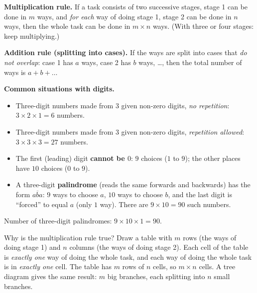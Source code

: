 \begin{knowbox}
\textbf{Multiplication rule.} If a task consists of two successive stages, stage 1 can be done in $m$ ways, and \emph{for each} way of doing stage 1, stage 2 can be done in $n$ ways, then the whole task can be done in $m\times n$ ways. (With three or four stages: keep multiplying.)

\medskip
\textbf{Addition rule (splitting into cases).} If the ways are split into cases that \emph{do not overlap}: case 1 has $a$ ways, case 2 has $b$ ways, \ldots, then the total number of ways is $a+b+\dots$

\medskip
\textbf{Common situations with digits.}
\begin{itemize}[leftmargin=1.2em,itemsep=1pt,topsep=2pt]
\item Three-digit numbers made from $3$ given non-zero digits, \emph{no repetition}: $3\times2\times1=6$ numbers.
\item Three-digit numbers made from $3$ given non-zero digits, \emph{repetition allowed}: $3\times3\times3=27$ numbers.
\item The first (leading) digit \textbf{cannot be $0$}: $9$ choices ($1$ to $9$); the other places have $10$ choices ($0$ to $9$).
\item A three-digit \textbf{palindrome} (reads the same forwards and backwards) has the form $\overline{aba}$: $9$ ways to choose $a$, $10$ ways to choose $b$, and the last digit is ``forced'' to equal $a$ (only $1$ way). There are $9\times10=90$ such numbers.
\end{itemize}
\end{knowbox}

\vspace{-6pt}
\begin{center}\footnotesize Number of three-digit palindromes: $9\times 10\times 1=90$.\end{center}

\begin{proofbox}
Why is the multiplication rule true? Draw a table with $m$ rows (the ways of doing stage 1) and $n$ columns (the ways of doing stage 2). Each cell of the table is \emph{exactly one} way of doing the whole task, and each way of doing the whole task is in \emph{exactly one} cell. The table has $m$ rows of $n$ cells, so $m\times n$ cells. A tree diagram gives the same result: $m$ big branches, each splitting into $n$ small branches.
\end{proofbox}

